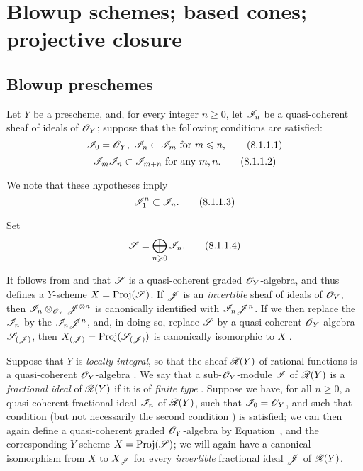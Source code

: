 \section{Blowup schemes; based cones; projective closure}
\label{section:II.8}

\subsection{Blowup preschemes}
\label{subsection:II.8.1}

\begin{env}[8.1.1]
\label{II.8.1.1}
Let $Y$ be a prescheme, and, for every integer $n\geq 0$, let $\mathscr{I}_n$ be a quasi-coherent sheaf of ideals of $\mathscr{O}_Y$; suppose that the following conditions are satisfied:
\[
\label{II.8.1.1.1}
  \mathscr{I}_0=\mathscr{O}_Y,\ \mathscr{I}_n\subset\mathscr{I}_m\text{ for }m\leqslant n,
\tag{8.1.1.1}
\]
\[
\label{II.8.1.1.2}
  \mathscr{I}_m\mathscr{I}_n\subset\mathscr{I}_{m+n}\text{ for any }m,n.
\tag{8.1.1.2}
\]

We note that these hypotheses imply
\[
\label{II.8.1.1.3}
  \mathscr{I}_1^n\subset\mathscr{I}_n.
\tag{8.1.1.3}
\]

Set
\[
\label{II.8.1.1.4}
  \mathscr{S}=\bigoplus_{n\geqslant 0}\mathscr{I}_n.
\tag{8.1.1.4}
\]

It follows from  and  that $\mathscr{S}$ is a quasi-coherent graded $\mathscr{O}_Y$-algebra, and thus defines a $Y$-scheme $X=\operatorname{Proj}(\mathscr{S})$.
If $\mathscr{J}$ is an \emph{invertible} sheaf of ideals of $\mathscr{O}_Y$, then $\mathscr{I}_n\otimes_{\mathscr{O}_Y}\mathscr{J}^{\otimes n}$ is canonically identified with $\mathscr{I}_n\mathscr{J}^n$.
If we then replace the $\mathscr{I}_n$ by the $\mathscr{I}_n\mathscr{J}^n$, and, in doing so, replace $\mathscr{S}$ by a quasi-coherent $\mathscr{O}_Y$-algebra $\mathscr{S}_{(\mathscr{J})}$, then $X_{(\mathscr{J})}=\operatorname{Proj}(\mathscr{S}_{(\mathscr{J})})$ is canonically isomorphic to $X$ .
\end{env}

\begin{env}[8.1.2]
\label{II.8.1.2}
Suppose that $Y$ is \emph{locally integral}, so that the sheaf $\mathscr{R}(Y)$ of rational functions is a quasi-coherent $\mathscr{O}_Y$-algebra .
We say that a sub-$\mathscr{O}_Y$-module $\mathscr{I}$ of $\mathscr{R}(Y)$ is a \emph{fractional ideal} of $\mathscr{R}(Y)$ if it is of \emph{finite type} .
Suppose we have, for all $n\geq0$, a quasi-coherent fractional ideal $\mathscr{I}_n$ of $\mathscr{R}(Y)$, such that $\mathscr{I}_0 = \mathscr{O}_Y$, and such that condition  (but not necessarily the second condition ) is satisfied;
we can then again define a quasi-coherent graded $\mathscr{O}_Y$-algebra by Equation~, and the corresponding $Y$-scheme $X = \operatorname{Proj}(\mathscr{S})$;
we will again have a canonical isomorphism from $X$ to $X_{{\mathscr{J}}}$ for every \emph{invertible} fractional ideal $\mathscr{J}$ of $\mathscr{R}(Y)$.
\end{env}

